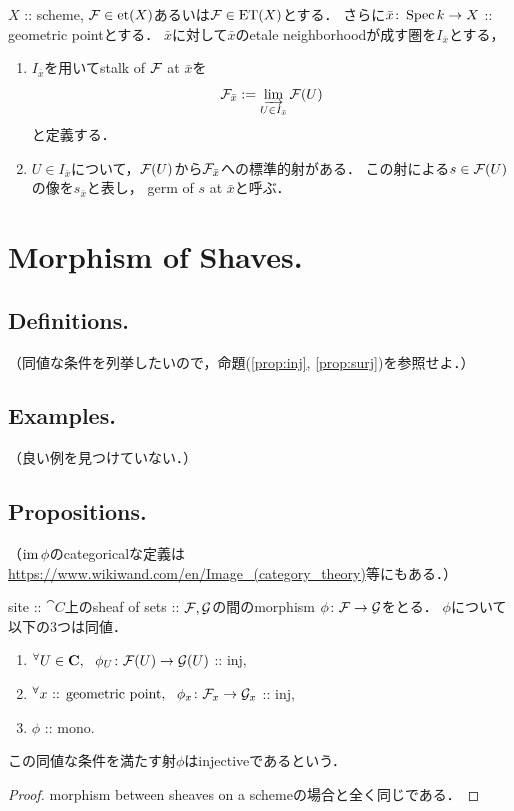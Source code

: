 \begin{Def}
    $X$ :: scheme,
    $\mathcal{F} \in \mathrm{et}(X)$あるいは$\mathcal{F} \in \mathrm{ET}(X)$とする．
    さらに$\bar{x} \colon \operatorname{Spec} k \to X$ :: geometric pointとする．
    $\bar{x}$に対して$\bar{x}$のetale neighborhoodが成す圏を$I_{\bar{x}}$とする，

    \begin{enumerate}[label=(\roman*)]
        \item 
        $I_{\bar{x}}$を用いてstalk of $\mathcal{F}$ at $\bar{x}$を
        \[ \mathcal{F}_{\bar{x}}:=\varinjlim_{U \in I_{\bar{x}}} \mathcal{F}(U) \]
        と定義する．

        \item
        $U \in I_{\bar{x}}$について，$\mathcal{F}(U)$から$\mathcal{F}_{\bar{x}}$への標準的射がある．
        この射による$s \in \mathcal{F}(U)$の像を$s_{\bar{x}}$と表し，
        germ of $s$ at $\bar{x}$と呼ぶ．
    \end{enumerate}
\end{Def}

\section{Morphism of Shaves.}
\subsection{Definitions.}
\begin{Def}
    （同値な条件を列挙したいので，命題(\ref{prop:inj}, \ref{prop:surj})を参照せよ．）
\end{Def}

\subsection{Examples.}
（良い例を見つけていない．）

\subsection{Propositions.}
\begin{Def}
    （$\operatorname{im} \phi$のcategoricalな定義は\url{https://www.wikiwand.com/en/Image_(category_theory)}等にもある．）
\end{Def}

\begin{Prop} \label{prop:inj}
    site :: $\cat{C}$上のsheaf of sets :: $\mathcal{F}, \mathcal{G}$の間のmorphism
    $\phi \colon \mathcal{F} \to \mathcal{G}$をとる．
    $\phi$について以下の$3$つは同値．
    \begin{enumerate}
        \item ${}^{\forall} U \in \mathbf{C},~~ \phi_{U} \colon \mathcal{F}(U) \to \mathcal{G}(U)$ :: inj,
        \item ${}^{\forall} x \text{ :: geometric point},~~ \phi_{x} \colon \mathcal{F}_x \to \mathcal{G}_x$ :: inj,
        \item $\phi$ :: mono.
    \end{enumerate}
    この同値な条件を満たす射$\phi$はinjectiveであるという．
\end{Prop}
\begin{proof}
    morphism between sheaves on a schemeの場合と全く同じである．
\end{proof}


